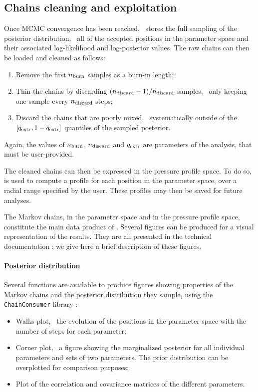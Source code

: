 \subsection{Chains cleaning and exploitation} \label{sec:algo:outputs}

Once MCMC convergence has been reached, \panco\ stores the full sampling of the posterior distribution, \ie\ all of the accepted positions in the parameter space and their associated log-likelihood and log-posterior values.
The raw chains can then be loaded and cleaned as follows:
\begin{enumerate}[leftmargin=*]
    \item Remove the first $n_{\rm burn}$ samples as a burn-in length;
    \item Thin the chains by discarding $(n_{\rm discard} - 1) / n_{\rm discard}$ samples, \ie\ only keeping one sample every $n_{\rm discard}$ steps;
    \item Discard the chains that are poorly mixed, \ie\ systematically outside of the $[q_{\rm extr}, 1 - q_{\rm extr}]$ quantiles of the sampled posterior.
\end{enumerate}
Again, the values of $n_{\rm burn}$, $n_{\rm discard}$ and $q_{\rm extr}$ are parameters of the analysis, that must be user-provided.

The cleaned chains can then be expressed in the pressure profile space.
To do so,  is used to compute a profile for each position in the parameter space, over a radial range specified by the user.
These profiles may then be saved for future analyses.

The Markov chains, in the parameter space and in the pressure profile space, constitute the main data product of \panco.
Several figures can be produced for a visual representation of the results.
They are all presented in the technical documentation ; we give here a brief description of these figures.

\paragraph{Posterior distribution}
Several functions are available to produce figures showing properties of the Markov chains and the posterior distribution they sample, using the \texttt{ChainConsumer} library \citep{hinton_chainconsumer_2016}:
\begin{itemize}[leftmargin=*]
    \item Walks plot, \ie\ the evolution of the positions in the parameter space with the number of steps for each parameter;
    \item Corner plot, \ie\ a figure showing the marginalized posterior for all individual parameters and sets of two parameters.
        The prior distribution can be overplotted for comparison purposes;
    \item Plot of the correlation and covariance matrices of the different parameters.
\end{itemize}

